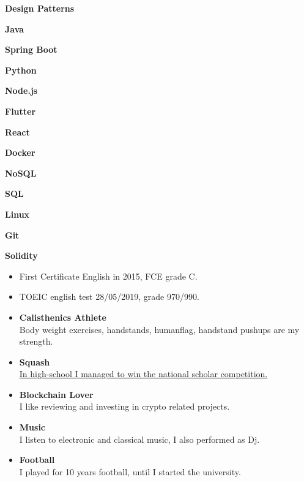 


\textbf{Design Patterns}

\textbf{Java}

\textbf{Spring Boot}

\textbf{Python}

\textbf{Node.js}

\textbf{Flutter}

\textbf{React}

\textbf{Docker}

\textbf{NoSQL}

\textbf{SQL}

\textbf{Linux}

\textbf{Git}

\textbf{Solidity}

\divider


\begin{itemize}
\item First Certificate English in 2015, FCE grade C.
\item TOEIC english test 28/05/2019, grade 970/990.
\end{itemize}

{}

\begin{itemize}
\item \textbf{Calisthenics Athlete}
\\
Body weight exercises, handstands, humanflag, handstand pushups are my strength.
\\
\item \textbf{Squash}
\\
\href{https://www.federsquash.it/notizie/1417-campionato-italiano-scolastico-2016.html}{In high-school I managed to win the national scholar competition.}
\\
\item \textbf{Blockchain Lover}
\\
I like reviewing and investing in crypto related projects.
\\
\item \textbf{Music}
\\
{I listen to electronic and classical music, I also performed as Dj}.
\\
\item \textbf{Football}
\\
I played for 10 years football, until I started the university.
\end{itemize}







